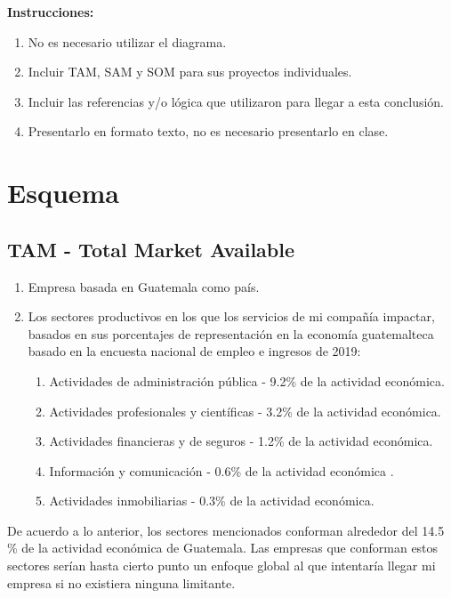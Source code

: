 





\textbf{Instrucciones:} 
\begin{enumerate}
	\item No es necesario utilizar el diagrama.
	\item Incluir TAM, SAM y SOM para sus proyectos individuales.
	\item Incluir las referencias y/o lógica que utilizaron para llegar a esta conclusión.
	\item Presentarlo en formato texto, no es necesario presentarlo en clase.
\end{enumerate}

\section{Esquema}

\subsection{TAM - Total Market Available}
\begin{enumerate}
	\item Empresa basada en Guatemala como país. 
	\item Los sectores productivos en los que los servicios de mi compañía impactar, basados en sus porcentajes de representación en la economía guatemalteca basado en la encuesta nacional de empleo e ingresos\cite{ine_guatemala_encuesta_2019} de 2019: 
	\begin{enumerate}
		\item Actividades de administración pública - 9.2\% de la actividad económica. 
		\item Actividades profesionales y científicas - 3.2\% de la actividad económica. 
		\item Actividades financieras y de seguros - 1.2\% de la actividad económica. 
		\item Información y comunicación - 0.6\% de la actividad económica . 
		\item Actividades inmobiliarias - 0.3\% de la actividad económica. 
	\end{enumerate}


\end{enumerate}
De acuerdo a lo anterior, los sectores mencionados conforman alrededor del 14.5 \% de la actividad económica de Guatemala. Las empresas que conforman estos sectores serían hasta cierto punto un enfoque global al que intentaría llegar mi empresa si no existiera ninguna limitante. 

